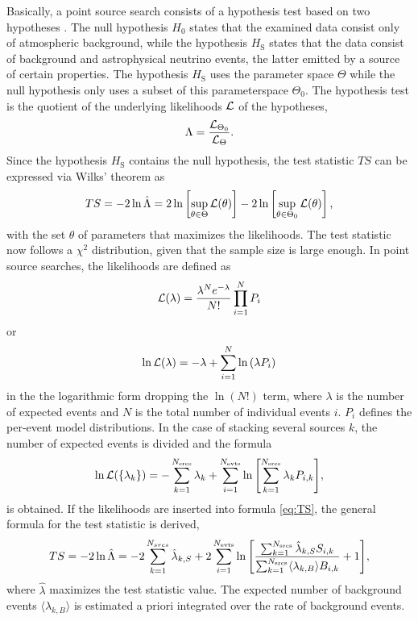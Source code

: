 Basically, a point source search consists of a hypothesis test based on two hypotheses \cite{likelihood_method}.
The null hypothesis $H_0$ states that the examined data consist only of atmospheric background, while the hypothesis $H_\text{S}$ states that the data consist of background and astrophysical neutrino events, the latter emitted by a source of certain properties.
The hypothesis $H_\text{S}$ uses the parameter space $\Theta$ while the null hypothesis only uses a subset of this parameterspace $\Theta_0$.
The hypothesis test is the quotient of the underlying likelihoods $\mathcal{L}$ of the hypotheses,
\begin{equation}
  \Lambda = \frac{\mathcal{L}_{\Theta_0}}{\mathcal{L}_\Theta}.
\end{equation}
Since the hypothesis $H_\text{S}$ contains the null hypothesis, the test statistic $TS$ can be expressed via Wilks' theorem \cite{wilk} as
\begin{equation}
  TS = -2\ln\hat{\Lambda} = 2\ln\left[ \sup_{\theta\in\Theta}\mathcal{L}(\theta) \right] - 2\ln\left[ \sup_{\theta\in\Theta_0}\mathcal{L}(\theta) \right], \label{eq:TS}
\end{equation}
with the set $\theta$ of parameters that maximizes the likelihoods.
The test statistic now follows a $\chi^2$ distribution, given that the sample size is large enough.
In point source searches, the likelihoods are defined as
\begin{equation}
  \mathcal{L}(\lambda) = \frac{\lambda^Ne^{-\lambda}}{N!}\prod^N_{i=1}P_i
\end{equation}
or
\begin{equation}
  \ln\mathcal{L}(\lambda) = -\lambda + \sum^N_{i=1}\ln{(\lambda P_i)}
\end{equation}
in the the logarithmic form \cite{ex_likelihood} dropping the $\ln(N!)$ term, where $\lambda$ is the number of expected events and $N$ is the total number of individual events $i$.
$P_i$ defines the per-event model distributions.
In the case of stacking several sources $k$, the number of expected events is divided and the formula
\begin{equation}
  \ln\mathcal{L}(\{\lambda_k\}) = -\sum^{N_\text{srcs}}_{k=1}\lambda_k + \sum^{N_\text{evts}}_{i=1}\ln{\left[ \sum^{N_\text{srcs}}_{k=1}\lambda_k P_{i,k} \right]},
\end{equation}
is obtained.
If the likelihoods are inserted into formula \eqref{eq:TS}, the general formula for the test statistic is derived,
\begin{equation}
    TS = -2\ln{\hat\Lambda} = -2\sum_{k=1}^{N_{srcs}}\hat\lambda_{k,S} + 2\sum_{i=1}^{N_{\text{evts}}}\ln{\left[ \frac{\sum_{k=1}^{N_{\text{srcs}}}\hat\lambda_{k,S}S_{i,k}}{\sum_{k=1}^{N_{\text{srcs}}}\langle\lambda_{k,B}\rangle B_{i,k}}+1 \right]},
\end{equation}
where $\hat\lambda$ maximizes the test statistic value.
The expected number of background events $\langle\lambda_{k,B}\rangle$ is estimated a priori integrated over the rate of background events.

